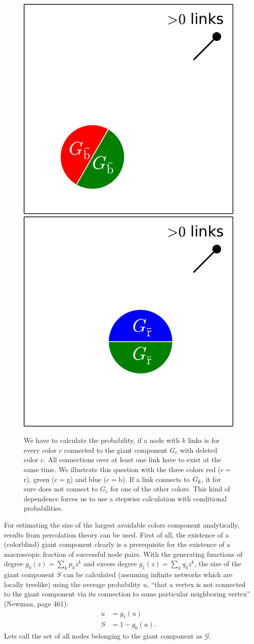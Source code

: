 \documentclass[aps, pre, onecolumn, a4paper, floatfix]{revtex4}
\begin{document}
\begin{figure}[htb]
\begin{minipage}[b]{0.6\linewidth}
\begin{center}
     \hspace{-1mm}
    \includegraphics[trim=100 0 0 0,clip,height=0.4\columnwidth]{sets_k_gc_no_3.pdf}
     \hspace{-1mm}
    \includegraphics[trim=100 0 0 0,clip,height=0.4\columnwidth]{sets_k_gc_no_1.pdf}
   \end{center}
  \end{minipage}
    \caption{We have to calculate the probability, if a node with $k$ links is 
    for every color $c$ connected to the giant component $G_{\bar c}$ with deleted 
    color $c$. All connections over at least one link have to exist at the same 
    time. We illustrate this question with the three colors red ($c=$r), green 
    ($c=$g) and blue ($c=$b). If a link connects to $G_{\bar{\rm g}}$, it for 
    sure does not connect to $G_{\bar c}$ for one of the other colors. This kind of 
    dependence forces us to use a stepwise calculation with conditional probabilities.}
    \label{fig:1}
\end{figure}


%
For estimating the size of the largest avoidable colors component analytically, results from percolation 
theory can be used. First of all, the existence of a (colorblind) giant component clearly is a 
prerequisite for the existence of a macroscopic fraction of successful node pairs. With the 
generating functions of degree $g_0(z)=\sum_k p_k z^k$ and excess degree 
$g_1(z)=\sum_k q_k z^k$, the size of the giant component $S$ can be calculated (assuming infinite
networks which are locally treelike) using 
the average probability $u$, ``that a vertex is not connected to the giant component 
via its connection to some particular neighboring vertex'' (Newman, page 461): 
\begin{align}
u &= g_1(u)\\
S &= 1 - g_0(u).\label{eq:gc}
\end{align}
Lets call the set of all nodes belonging to the giant component as ${\mathcal G}$. 
\end{document}
